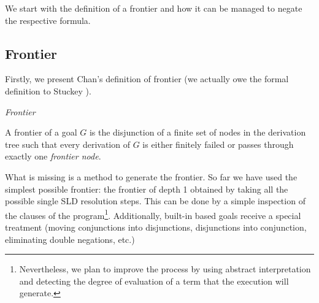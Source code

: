 \documentclass{llncs}
\newcommand{\naf}{{\em naf}}\newcommand{\viejo}[1]{}
\begin{document}


We start with the definition of a frontier and how it can be managed
to negate the respective formula.


\subsection{Frontier}
\label{frontier}

Firstly, we present Chan's definition of frontier (we actually owe the formal
definition to Stuckey \cite{Stuckey95}).

\begin{definition}{\em Frontier}

A frontier of a goal $G$ is the disjunction of a finite set of nodes
in the derivation tree such that every derivation of $G$ is either
finitely failed or passes through exactly one {\em frontier node}.
\end{definition}

What is missing is a method to generate the frontier. So far we have
used the simplest possible frontier: the frontier of depth 1 obtained
by taking all the possible single SLD resolution steps. This can be
done by a simple inspection of the clauses of the
program\footnote{Nevertheless, we plan to improve the process by using
abstract interpretation and detecting the degree of evaluation of a
term that the execution will generate.}.  Additionally, built-in based
goals receive a special treatment (moving conjunctions into
disjunctions, disjunctions into conjunction, eliminating double
negations, etc.)
\end{document}
